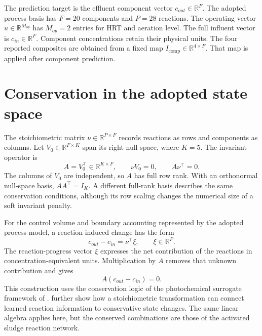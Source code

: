The prediction target is the effluent component vector \(c_{out}\in\mathbb{R}^{F}\). The adopted process basis has \(F=20\) components and \(P=28\) reactions. The operating vector \(u\in\mathbb{R}^{M_{op}}\) has \(M_{op}=2\) entries for HRT and aeration level. The full influent vector is \(c_{in}\in\mathbb{R}^{F}\). Component concentrations retain their physical units. The four reported composites are obtained from a fixed map \(I_{\mathrm{comp}}\in\mathbb{R}^{4\times F}\). That map is applied after component prediction.

\section{Conservation in the adopted state space}

The stoichiometric matrix \(\nu\in\mathbb{R}^{P\times F}\) records reactions as rows and components as columns. Let \(V_0\in\mathbb{R}^{F\times K}\) span its right null space, where \(K=5\). The invariant operator is
\begin{equation}
\label{eq:icsor_invariant_operator}
A=V_0^\top\in\mathbb{R}^{K\times F},
\qquad \nu V_0=0,
\qquad A\nu^\top=0.
\end{equation}
The columns of \(V_0\) are independent, so \(A\) has full row rank. With an orthonormal null-space basis, \(AA^\top=I_K\). A different full-rank basis describes the same conservation conditions, although its row scaling changes the numerical size of a soft invariant penalty.

For the control volume and boundary accounting represented by the adopted process model, a reaction-induced change has the form
\begin{equation}
\label{eq:icsor_stoichiometric_change}
c_{out}-c_{in}=\nu^\top\xi,
\qquad \xi\in\mathbb{R}^{P}.
\end{equation}
The reaction-progress vector \(\xi\) expresses the net contribution of the reactions in concentration-equivalent units. Multiplication by \(A\) removes that unknown contribution and gives
\begin{equation}
\label{eq:icsor_invariant_balance}
A(c_{out}-c_{in})=0.
\end{equation}
This construction uses the conservation logic of the photochemical surrogate framework of \citet{SturmWexler2020}. \citet{SturmWexler2022} further show how a stoichiometric transformation can connect learned reaction information to conservative state changes. The same linear algebra applies here, but the conserved combinations are those of the activated sludge reaction network.

